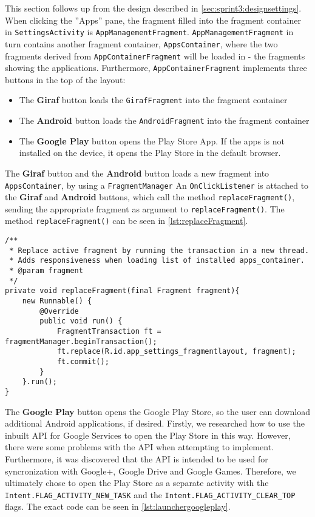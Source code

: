 This section follows up from the design described in \cref{sec:sprint3:designsettings}.
When clicking the ''Apps'' pane, the fragment filled into the fragment container in \lstinline!SettingsActivity! is \lstinline!AppManagementFragment!.
\lstinline!AppManagementFragment! in turn contains another fragment container, \lstinline!AppsContainer!, where the two fragments derived from \lstinline!AppContainerFragment! will be loaded in - the fragments showing the applications.
Furthermore, \lstinline!AppContainerFragment! implements three buttons in the top of the layout:

\begin{itemize}
\item The \textbf{Giraf} button loads the \lstinline!GirafFragment! into the fragment container
\item The \textbf{Android} button loads the \lstinline!AndroidFragment! into the fragment container
\item The \textbf{Google Play} button opens the Play Store App. If the apps is not installed on the device, it opens the Play Store in the default browser.
\end{itemize}

The \textbf{Giraf} button and the \textbf{Android} button loads a new fragment into \lstinline!AppsContainer!, by using a \lstinline!FragmentManager!
An  \lstinline!OnClickListener! is attached to the \textbf{Giraf} and \textbf{Android} buttons, which call the method \lstinline!replaceFragment()!, sending the appropriate fragment as argument to \lstinline!replaceFragment()!.
The method \lstinline!replaceFragment()! can be seen in \cref{lst:replaceFragment}.

\begin{lstlisting}[caption={Method used to replace the fragment currently loaded into the fragment container in AppManagementFragment}, label={lst:replaceFragment}]
/**
 * Replace active fragment by running the transaction in a new thread.
 * Adds responsiveness when loading list of installed apps_container.
 * @param fragment
 */
private void replaceFragment(final Fragment fragment){
    new Runnable() {
        @Override
        public void run() {
            FragmentTransaction ft = fragmentManager.beginTransaction();
            ft.replace(R.id.app_settings_fragmentlayout, fragment);
            ft.commit();
        }
    }.run();
}
\end{lstlisting}

The \textbf{Google Play} button opens the Google Play Store, so the user can download additional Android applications, if desired. 
Firstly, we researched how to use the inbuilt API for Google Services  to open the Play Store in this way.
However, there were some problems with the API when attempting to implement.
Furthermore, it was discovered that the API is intended to be used for syncronization with Google+, Google Drive and Google Games.
Therefore, we ultimately chose to open the Play Store as a separate activity with the \lstinline!Intent.FLAG_ACTIVITY_NEW_TASK! and the \lstinline!Intent.FLAG_ACTIVITY_CLEAR_TOP! flags.
The exact code can be seen in \cref{lst:launchergoogleplay}.

